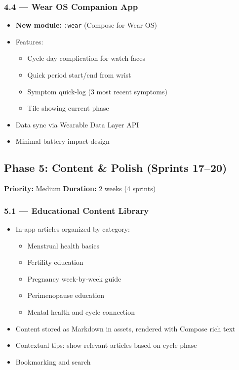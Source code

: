 \documentclass[12pt,a4paper]{article}
\begin{document}
\subsubsection{4.4 — Wear OS Companion App}
\begin{itemize}[leftmargin=1.5em]
  \item \textbf{New module:} \texttt{:wear} (Compose for Wear OS)
  \item Features:
  \begin{itemize}
    \item Cycle day complication for watch faces
    \item Quick period start/end from wrist
    \item Symptom quick-log (3 most recent symptoms)
    \item Tile showing current phase
  \end{itemize}
  \item Data sync via Wearable Data Layer API
  \item Minimal battery impact design
\end{itemize}

\subsection{\textcolor{phase5}{Phase 5: Content \& Polish (Sprints 17--20)}}

\begin{tcolorbox}[colback=phase5!5, colframe=phase5, title=\textbf{Goal: Content, community, and production readiness}]
\textbf{Priority:} Medium \hfill \textbf{Duration:} 2 weeks (4 sprints)
\end{tcolorbox}

\subsubsection{5.1 — Educational Content Library}
\begin{itemize}[leftmargin=1.5em]
  \item In-app articles organized by category:
  \begin{itemize}
    \item Menstrual health basics
    \item Fertility education
    \item Pregnancy week-by-week guide
    \item Perimenopause education
    \item Mental health and cycle connection
  \end{itemize}
  \item Content stored as Markdown in assets, rendered with Compose rich text
  \item Contextual tips: show relevant articles based on cycle phase
  \item Bookmarking and search
\end{itemize}
\end{document}
